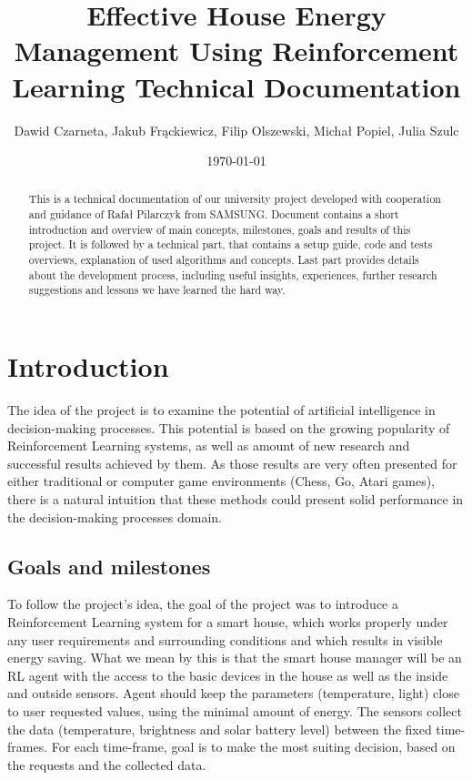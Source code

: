 \documentclass{article}
\title{Effective House Energy Management Using Reinforcement Learning Technical Documentation} %
\author{Dawid Czarneta, Jakub Frąckiewicz, Filip Olszewski, Michał Popiel, Julia Szulc}
\date{\today}
\begin{document}
\maketitle

\begin{abstract}
This is a technical documentation of our university project developed with cooperation and guidance of Rafał Pilarczyk from SAMSUNG. Document contains a short introduction and overview of main concepts, milestones, goals and results of this project. It is followed by a technical part, that contains a setup guide, code and tests overviews, explanation of used algorithms and concepts. Last part provides details about the development process, including useful insights, experiences, further research suggestions and lessons we have learned the hard way.
\end{abstract}


\section{Introduction}
The idea of the project is to examine the potential of artificial intelligence in decision-making processes. This potential is based on the growing popularity of Reinforcement Learning systems, as well as amount of new research and successful results achieved by them. As those results are very often presented for either traditional or computer game environments (Chess, Go, Atari games), there is a natural intuition that these methods could present solid performance in the decision-making processes domain.


\subsection{Goals and milestones}
To follow the project's idea, the goal of the project was to introduce a Reinforcement Learning system for a smart house, which works properly under any user requirements and surrounding conditions and which results in visible energy saving. What we mean by this is that the smart house manager will be an RL agent with the access to the basic devices in the house as well as the inside and outside sensors. Agent should keep the parameters (temperature, light) close to user requested values, using the minimal amount of energy. The sensors collect the data (temperature, brightness and solar battery level) between the fixed time-frames. For each time-frame, goal is to make the most suiting decision, based on the requests and the collected data.
\end{document}
